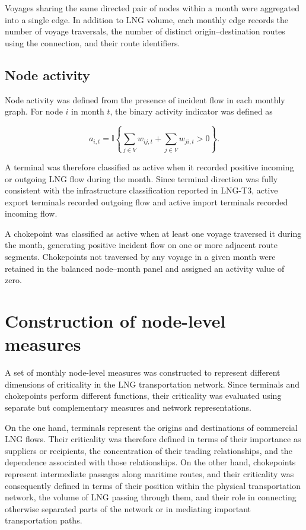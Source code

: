 \documentclass[pdftex,12pt,openright,a4paper,oneside]{book}
\begin{document}
Voyages sharing the same directed pair of nodes within a month were aggregated into a single edge. 
In addition to LNG volume, each monthly edge records the number of voyage traversals, the number of distinct origin--destination routes using the connection, and their route identifiers.

\subsection{Node activity} 
\label{subsec:node_activity_definition} 
Node activity was defined from the presence of incident flow in each monthly graph. 
For node \(i\) in month \(t\), the binary activity indicator was defined as

\begin{equation} 
    a_{i,t} = \mathbb{I} \left\{ \sum_{j\in V} w_{ij,t} + \sum_{j\in V} w_{ji,t} > 0 \right\}. 
    \label{eq:node_activity} 
\end{equation} 

A terminal was therefore classified as active when it recorded positive incoming or outgoing LNG flow during the month. 
Since terminal direction was fully consistent with the infrastructure classification reported in LNG-T3, active export terminals recorded outgoing flow and active import terminals recorded incoming flow. 

A chokepoint was classified as active when at least one voyage traversed it during the month, generating positive incident flow on one or more adjacent route segments. 
Chokepoints not traversed by any voyage in a given month were retained in the balanced node--month panel and assigned an activity value of zero.

\section{Construction of node-level measures}
\label{sec:node_level_measures}

A set of monthly node-level measures was constructed to represent different dimensions of criticality in the LNG transportation network. 
Since terminals and chokepoints perform different functions, their criticality was evaluated using separate but complementary measures and network representations.

On the one hand, terminals represent the origins and destinations of commercial LNG flows. 
Their criticality was therefore defined in terms of their importance as suppliers or recipients, the concentration of their trading relationships, and the dependence associated with those relationships. 
On the other hand, chokepoints represent intermediate passages along maritime routes, and their criticality was consequently defined in terms of their position within the physical transportation network, the volume of LNG passing through them, and their role in connecting otherwise separated parts of the network or in mediating important transportation paths.
\end{document}
